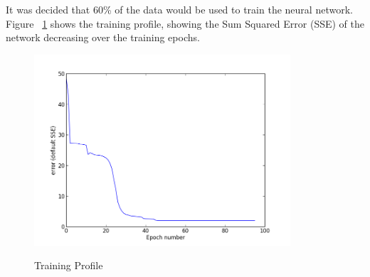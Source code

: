 \documentclass{article}
\begin{document}
It was decided that 60\% of the data would be used to train the neural network. 
Figure ~\ref{fig:f1} shows the training profile, showing the Sum Squared Error (SSE) of the network decreasing over the training epochs.
\begin{figure}[h!]
\caption{Training Profile}
  \centering
    \includegraphics[width=0.85\textwidth]{figure_1.png}
  \label{fig:f1}
\end{figure}
\end{document}
